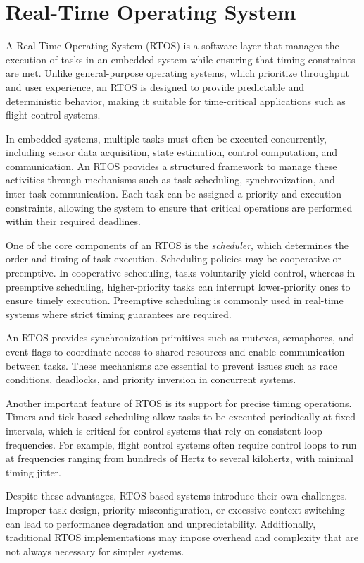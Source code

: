 \section{Real-Time Operating System}
\label{sec:rtos}

A Real-Time Operating System (RTOS) is a software layer that manages the execution of tasks in an embedded system while ensuring that timing constraints are met. Unlike general-purpose operating systems, which prioritize throughput and user experience, an RTOS is designed to provide predictable and deterministic behavior, making it suitable for time-critical applications such as flight control systems.

In embedded systems, multiple tasks must often be executed concurrently, including sensor data acquisition, state estimation, control computation, and communication. An RTOS provides a structured framework to manage these activities through mechanisms such as task scheduling, synchronization, and inter-task communication. Each task can be assigned a priority and execution constraints, allowing the system to ensure that critical operations are performed within their required deadlines.

One of the core components of an RTOS is the \textit{scheduler}, which determines the order and timing of task execution. Scheduling policies may be cooperative or preemptive. In cooperative scheduling, tasks voluntarily yield control, whereas in preemptive scheduling, higher-priority tasks can interrupt lower-priority ones to ensure timely execution. Preemptive scheduling is commonly used in real-time systems where strict timing guarantees are required.

An RTOS provides synchronization primitives such as mutexes, semaphores, and event flags to coordinate access to shared resources and enable communication between tasks. These mechanisms are essential to prevent issues such as race conditions, deadlocks, and priority inversion in concurrent systems.

Another important feature of RTOS is its support for precise timing operations. Timers and tick-based scheduling allow tasks to be executed periodically at fixed intervals, which is critical for control systems that rely on consistent loop frequencies. For example, flight control systems often require control loops to run at frequencies ranging from hundreds of Hertz to several kilohertz, with minimal timing jitter.

Despite these advantages, RTOS-based systems introduce their own challenges. Improper task design, priority misconfiguration, or excessive context switching can lead to performance degradation and unpredictability. Additionally, traditional RTOS implementations may impose overhead and complexity that are not always necessary for simpler systems.

